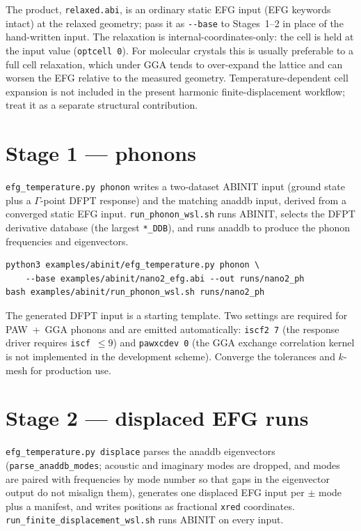 \documentclass[11pt,oneside]{report}
\newcommand{\code}[1]{{\small\nolinkurl{#1}}}
\newcommand{\cmd}[1]{\texttt{\small #1}}
\begin{document}
The product, \code{relaxed.abi}, is an ordinary static EFG input (EFG keywords
intact) at the relaxed geometry; pass it as \code{--base} to Stages~1--2 in place
of the hand-written input. The relaxation is internal-coordinates-only: the cell
is held at the input value (\cmd{optcell 0}). For molecular crystals this is
usually preferable to a full cell relaxation, which under GGA tends to over-expand
the lattice and can worsen the EFG relative to the measured geometry.
Temperature-dependent cell expansion is not included in the present harmonic
finite-displacement workflow; treat it as a separate structural contribution.

\section{Stage 1 --- phonons}

\cmd{efg\_temperature.py phonon} writes a two-dataset ABINIT input (ground state
plus a $\Gamma$-point DFPT response) and the matching anaddb input, derived from a
converged static EFG input. \code{run\_phonon\_wsl.sh} runs ABINIT, selects the
DFPT derivative database (the largest \code{*\_DDB}), and runs anaddb to produce
the phonon frequencies and eigenvectors.

\begin{lstlisting}
python3 examples/abinit/efg_temperature.py phonon \
    --base examples/abinit/nano2_efg.abi --out runs/nano2_ph
bash examples/abinit/run_phonon_wsl.sh runs/nano2_ph
\end{lstlisting}

The generated DFPT input is a starting template. Two settings are required for
PAW~+~GGA phonons and are emitted automatically: \cmd{iscf2 7} (the response
driver requires \code{iscf}~$\leq 9$) and \cmd{pawxcdev 0} (the GGA exchange
correlation kernel is not implemented in the development scheme). Converge the
tolerances and $k$-mesh for production use.

\section{Stage 2 --- displaced EFG runs}

\cmd{efg\_temperature.py displace} parses the anaddb eigenvectors
(\code{parse\_anaddb\_modes}; acoustic and imaginary modes are dropped, and modes
are paired with frequencies by mode number so that gaps in the eigenvector output
do not misalign them), generates one displaced EFG input per $\pm$ mode plus a
manifest, and writes positions as fractional \code{xred} coordinates.
\code{run\_finite\_displacement\_wsl.sh} runs ABINIT on every input.
\end{document}
